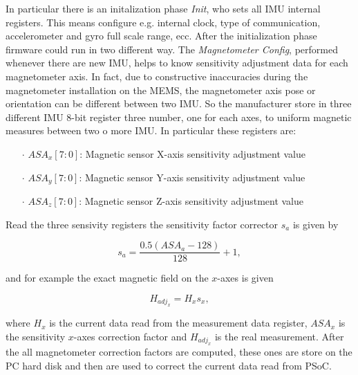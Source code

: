 In particular there is an initalization phase \textit{Init}, who sets all IMU internal registers. This means configure e.g. internal clock, type of communication, accelerometer and gyro full scale range, ecc. 
After the initialization phase firmware could run in two different way. The \textit{Magnetometer Config}, performed whenever there are new IMU, helps to know sensitivity adjustment data for each magnetometer axis. In fact, due to constructive inaccuracies during the magnetometer installation on the MEMS, the magnetometer axis pose or orientation can be different between two IMU. So the manufacturer store in three different IMU 8-bit register three number, one for each axes, to uniform magnetic measures between two o more IMU. In particular these registers are:

\begin{enumerate}
\item[$\cdot$] $ASA_x[7:0]$: Magnetic sensor X-axis sensitivity adjustment value
\item[$\cdot$] $ASA_y[7:0]$: Magnetic sensor Y-axis sensitivity adjustment value
\item[$\cdot$] $ASA_z[7:0]$: Magnetic sensor Z-axis sensitivity adjustment value
\end{enumerate}

Read the three sensivity registers the sensitivity factor corrector $s_a$ is given by %

\begin{equation}
s_a  = \frac{ 0.5(ASA_a - 128)}{128} + 1,
\end{equation} 

\noindent and for example the exact magnetic field on the $x$-axes is given

\begin{equation}
H_{{adj}_x} = H_x s_x,
\end{equation} 

\noindent where $H_x$ is the current data read from the measurement data register, $ASA_x$ is the sensitivity $x$-axes correction factor and $H_{{adj}_x}$ is the real measurement. 
After the all magnetometer correction factors are computed, these ones are store on the PC hard disk and then are used to correct the current data read from PSoC. %

